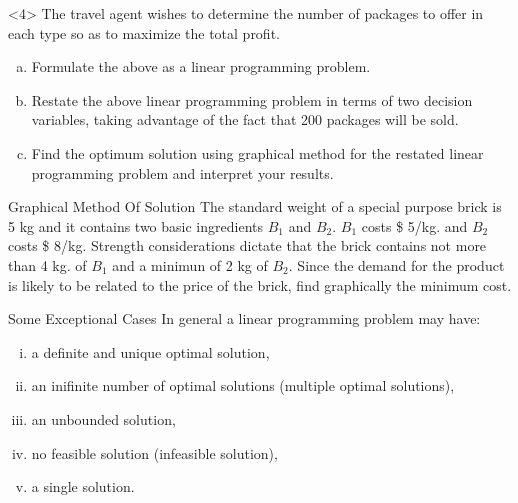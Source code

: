 \begin{frameExample}{}{}
    


  \begin{onlyenv}<4>
    The travel agent wishes to determine the number of packages to offer in each type so as to maximize the total profit.    
          \begin{enumerate}[a)]
    \item Formulate the above as a linear programming problem.
    \item Restate the above linear programming problem in terms of two decision variables, taking advantage of the fact that 200 packages will be sold.
    \item Find the optimum solution using graphical method for the restated linear programming problem and interpret your results.
    \end{enumerate}
    \end{onlyenv}
  \end{frameExample}

  \begin{frameExample}{Graphical Method Of Solution}{}
    The standard weight of a special purpose brick is 5 kg and it contains two basic ingredients $B_1$ and $B_2$. $B_1$ costs \$ 5/kg. and $B_2$ costs \$ 8/kg. Strength considerations dictate that the brick contains not more than 4 kg. of $B_1$ and a minimun of 2 kg of $B_2$. Since the demand for the product is likely to be related to the price of the brick, find graphically the minimum cost.
  \end{frameExample}

  \begin{frame}{Some Exceptional Cases}{}
    In general a linear programming problem may have:

    \begin{enumerate}[i)] \parskip4mm \justifying
    \item a definite and unique optimal solution,
    \item an inifinite number of optimal solutions (multiple optimal solutions),
    \item an unbounded solution,
    \item no feasible solution (infeasible solution),
    \item a single solution.
    \end{enumerate}
  \end{frame}
  
